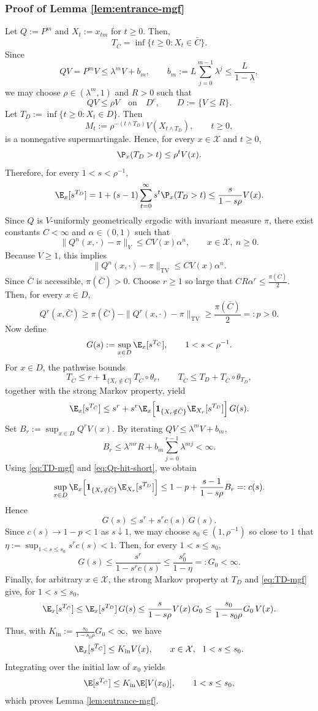 \documentclass[mnsc,nonblindrev]{informs3}
\begin{document}
\subsubsection{Proof of Lemma \ref{lem:entrance-mgf}}\label{sec:entrance-mgf}
Let $Q:=P^m$ and $X_t:=x_{tm}$ for $t\ge0$. Then, 
\[
T_{\bar C}=\inf\{t\ge0:X_t\in\bar C\}.
\]
Since
\[
QV=P^mV\le \lambda^mV+b_m,
\qquad
b_m:=L\sum_{j=0}^{m-1}\lambda^j\le \frac{L}{1-\lambda},
\]
we may choose \(\rho\in(\lambda^m,1)\) and \(R>0\) such that
\[
QV\le \rho V \quad \text{on}\quad D^c,
\qquad
D:=\{V\le R\}.
\]
Let $T_D:=\inf\{t\ge0:X_t\in D\}.$ Then
\[
M_t:=\rho^{-(t\wedge T_D)}V(X_{t\wedge T_D}),\qquad t\ge0,
\]
is a nonnegative supermartingale. Hence, for every \(x\in\mathcal X\) and \(t\ge0\),
\[
\P_x(T_D>t)\le \rho^t V(x).
\]
Therefore, for every \(1<s<\rho^{-1}\),
\begin{equation}\label{eq:TD-mgf}
\E_x[s^{T_D}]
=
1+(s-1)\sum_{t=0}^\infty s^t\P_x(T_D>t)
\le \frac{s}{1-s\rho}V(x).
\end{equation}
Since \(Q\) is \(V\)-uniformly geometrically ergodic with invariant measure \(\pi\),
there exist constants \(C<\infty\) and \(\alpha\in(0,1)\) such that 
\[
\|Q^n(x,\cdot)-\pi\|_V\le C V(x)\alpha^n,
\qquad x\in\mathcal X,\ n\ge0.
\]
Because \(V\ge1\), this implies
\[
\|Q^n(x,\cdot)-\pi\|_{\mathrm{TV}}\le C V(x)\alpha^n.
\]
Since \(\bar C\) is accessible, \(\pi(\bar C)>0\). Choose \(r\ge1\) so large that $CR\alpha^r\le \frac{\pi(\bar C)}{2}.$ Then, for every \(x\in D\),
\begin{equation}\label{eq:Qr-hit-short}
Q^r(x,\bar C)
\ge \pi(\bar C)-\|Q^r(x,\cdot)-\pi\|_{\mathrm{TV}}
\ge \frac{\pi(\bar C)}{2}
=:p>0.
\end{equation}
Now define
\[
G(s):=\sup_{x\in D}\E_x[s^{T_{\bar C}}],
\qquad 1<s<\rho^{-1}.
\]
For \(x\in D\), the pathwise bounds
\[
T_{\bar C}\le r+\mathbf 1_{\{X_r\notin\bar C\}}\,T_{\bar C}\circ\theta_r,
\qquad
T_{\bar C}\le T_D+T_{\bar C}\circ\theta_{T_D},
\]
together with the strong Markov property, yield
\[
\E_x[s^{T_{\bar C}}]
\le
s^r+s^r\E_x\!\left[
\mathbf 1_{\{X_r\notin\bar C\}}\E_{X_r}[s^{T_D}]
\right]G(s).
\]
Set $B_r:=\sup_{x\in D}Q^rV(x).$ By iterating \(QV\le \lambda^mV+b_m\),
\[
B_r\le \lambda^{mr}R+b_m\sum_{j=0}^{r-1}\lambda^{mj}<\infty.
\]
Using \eqref{eq:TD-mgf} and \eqref{eq:Qr-hit-short}, we obtain
\[
\sup_{x\in D}
\E_x\!\left[
\mathbf 1_{\{X_r\notin\bar C\}}\E_{X_r}[s^{T_D}]
\right]
\le
1-p+\frac{s-1}{1-s\rho}B_r
=:c(s).
\]
Hence
\[
G(s)\le s^r+s^rc(s)\,G(s).
\]
Since \(c(s)\to 1-p<1\) as \(s\downarrow1\), we may choose
\(s_0\in(1,\rho^{-1})\) so close to \(1\) that $\eta:=\sup_{1<s\le s_0}s^rc(s)<1.$ Then, for every \(1<s\le s_0\),
\[
G(s)\le \frac{s^r}{1-s^rc(s)}
\le \frac{s_0^r}{1-\eta}
=:G_0<\infty.
\]
Finally, for arbitrary \(x\in\mathcal X\), the strong Markov property at \(T_D\)
and \eqref{eq:TD-mgf} give, for \(1<s\le s_0\),
\[
\E_x[s^{T_{\bar C}}]
\le \E_x[s^{T_D}]\,G(s)
\le \frac{s}{1-s\rho}V(x)\,G_0
\le \frac{s_0}{1-s_0\rho}G_0\,V(x).
\]
Thus, with $K_{\mathrm{in}}:=\frac{s_0}{1-s_0\rho}G_0<\infty,$ we have
\[
\E_x[s^{T_{\bar C}}]\le K_{\mathrm{in}}V(x),
\qquad x\in\mathcal X,\ \ 1<s\le s_0.
\]
Integrating over the initial law of \(x_0\) yields
\[
\E[s^{T_{\bar C}}]\le K_{\mathrm{in}}\E[V(x_0)],
\qquad 1<s\le s_0,
\]
which proves Lemma \ref{lem:entrance-mgf}.
\end{document}
